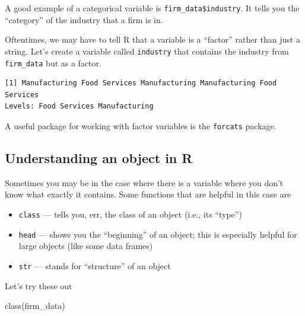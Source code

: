 \documentclass[
  letterpaper,
  DIV=11,
  numbers=noendperiod]{scrreprt}
\newenvironment{Shaded}{\begin{snugshade}}{\end{snugshade}}
\newcommand{\FunctionTok}[1]{\textcolor[rgb]{0.28,0.35,0.67}{#1}}
\newcommand{\NormalTok}[1]{\textcolor[rgb]{0.00,0.23,0.31}{#1}}
\newcommand{\OtherTok}[1]{\textcolor[rgb]{0.00,0.23,0.31}{#1}}
\newcommand{\SpecialCharTok}[1]{\textcolor[rgb]{0.37,0.37,0.37}{#1}}
\begin{document}
A good example of a categorical variable is
\texttt{firm\_data\$industry}. It tells you the ``category'' of the
industry that a firm is in.

Oftentimes, we may have to tell R that a variable is a ``factor'' rather
than just a string. Let's create a variable called \texttt{industry}
that contains the industry from \texttt{firm\_data} but as a factor.

\begin{Shaded}
\end{Shaded}

\begin{verbatim}
[1] Manufacturing Food Services Manufacturing Manufacturing Food Services
Levels: Food Services Manufacturing
\end{verbatim}

A useful package for working with factor variables is the
\texttt{forcats} package.

\subsection{Understanding an object in
R}\label{understanding-an-object-in-r}

Sometimes you may be in the case where there is a variable where you
don't know what exactly it contains. Some functions that are helpful in
this case are

\begin{itemize}
\item
  \texttt{class} --- tells you, err, the class of an object (i.e., its
  ``type'')
\item
  \texttt{head} --- shows you the ``beginning'' of an object; this is
  especially helpful for large objects (like some data frames)
\item
  \texttt{str} --- stands for ``structure'' of an object
\end{itemize}

Let's try these out

\begin{Shaded}
\begin{Highlighting}[]
\FunctionTok{class}\NormalTok{(firm\_data)}
\end{Highlighting}
\end{Shaded}
\end{document}
